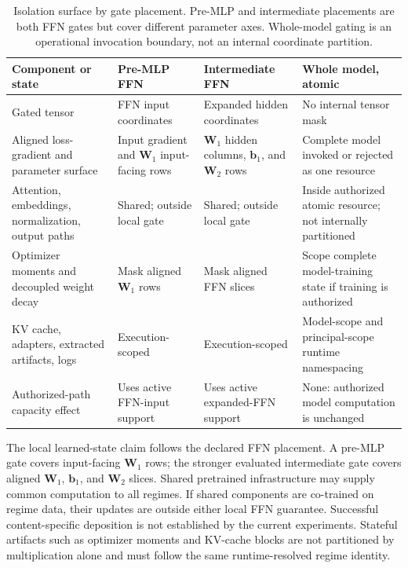 \documentclass[11pt,a4paper]{article}
\newcommand{\bW}{\mathbf{W}}
\begin{document}
\begin{table}[ht]
\centering
\caption{Isolation surface by gate placement.  Pre-MLP and
intermediate placements are both FFN gates but cover different
parameter axes.  Whole-model gating is an operational invocation
boundary, not an internal coordinate partition.}
\label{tab:isolation-surface}
\scriptsize
\begin{tabularx}{\textwidth}{@{}p{3.0cm}XXX@{}}
\toprule
\textbf{Component or state} &
\textbf{Pre-MLP FFN} &
\textbf{Intermediate FFN} &
\textbf{Whole model, atomic} \\
\midrule
Gated tensor &
FFN input coordinates &
Expanded hidden coordinates &
No internal tensor mask \\
Aligned loss-gradient and parameter surface &
Input gradient and $\bW_1$ input-facing rows &
$\bW_1$ hidden columns, $\mathbf b_1$, and $\bW_2$ rows &
Complete model invoked or rejected as one resource \\
Attention, embeddings, normalization, output paths &
Shared; outside local gate &
Shared; outside local gate &
Inside authorized atomic resource; not internally partitioned \\
Optimizer moments and decoupled weight decay &
Mask aligned $\bW_1$ rows &
Mask aligned FFN slices &
Scope complete model-training state if training is authorized \\
KV cache, adapters, extracted artifacts, logs &
Execution-scoped &
Execution-scoped &
Model-scope and principal-scope runtime namespacing \\
Authorized-path capacity effect &
Uses active FFN-input support &
Uses active expanded-FFN support &
None: authorized model computation is unchanged \\
\bottomrule
\end{tabularx}
\end{table}

The local learned-state claim follows the declared FFN placement.  A
pre-MLP gate covers input-facing $\bW_1$ rows; the stronger evaluated
intermediate gate covers aligned $\bW_1$, $\mathbf b_1$, and $\bW_2$
slices.  Shared pretrained infrastructure may supply common
computation to all regimes.  If shared components are co-trained on
regime data, their updates are outside either local FFN guarantee.
Successful content-specific deposition is not established by the
current experiments.  Stateful
artifacts such as optimizer moments and KV-cache blocks are not
partitioned by multiplication alone and must follow the same
runtime-resolved regime identity.
\end{document}

